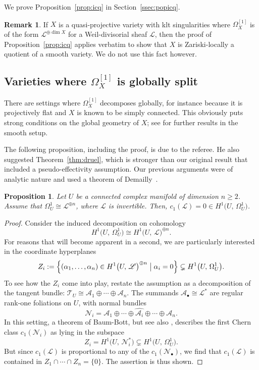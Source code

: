 \documentclass[JEP,XML,SOM,Unicode,published]{cedram}
\let\scr\mathscr
\let\vref\ref
\newcommand{\sbullet}{{\scriptscriptstyle\bullet}}
\theoremstyle{plain}
\newtheorem{prop}[thm]{Proposition}
\theoremstyle{definition}
\newtheorem{rem}[thm]{Remark}
\numberwithin{equation}{thm}
\numberwithin{enumi}{thm}
\newcommand{\sA}{\scr{A}}
\newcommand{\sL}{\scr{L}}
\newcommand{\sN}{\scr{N}}
\newcommand{\sT}{\scr{T}}
\let\what\widehat
\begin{document}
We prove Proposition~\ref{prop:icq} in Section~\vref{ssec:popicq}.

\begin{rem}
If $X$ is a quasi-projective variety with klt singularities where $\Omega^{[1]}_X$
is of the form $\sL^{\oplus \dim X}$ for a Weil-divisorial sheaf $\sL$, then the proof
of Proposition~\ref{prop:icq} applies verbatim to show that $X$ is
Zariski-locally a quotient of a smooth variety. We do not use this fact
however.
\end{rem}

\subsection{Varieties where $\Omega^{[1]}_X$ is globally split}
\label{sec:4-2}

There are settings where $\Omega^{[1]}_X$ decomposes globally, for instance because
it is projectively flat and $X$ is known to be simply connected. This obviously
puts strong conditions on the global geometry of $X$; see \cite{MR1758581} for
further results in the smooth setup.

The following proposition, including the proof, is due to the referee. He also
suggested Theorem~\ref{thm:druel}, which is stronger than our original result
that included a pseudo-effectivity assumption. Our previous arguments were of
analytic nature and used a theorem of Demailly~\cite{Dem02}.

\begin{prop}\label{prop:druel}
Let $U$ be a connected complex manifold of dimension $n \geq 2$. Assume that
$\Omega^1_U \cong \sL^{\oplus n}$, where $\sL$ is invertible. Then,
$c_1(\sL) = 0 \in H^1 \bigl(U,\, \Omega^1_U \bigr)$.
\end{prop}
\begin{proof}
Consider the induced decomposition on cohomology
\[
H^1 \bigl(U,\, \Omega^1_U\bigr) \cong H^1\bigl(U,\, \sL \bigr)^{\oplus n}.
\]
For reasons that
will become apparent in a second, we are particularly interested in the
coordinate hyperplanes
\[
Z_i := \left\{ (\alpha_1, \dots, \alpha_n) \in H^1\bigl(U,\, \sL \bigr)^{\oplus n} \bigm| \alpha_i = 0
\right\} \subsetneq H^1 \bigl(U,\, \Omega^1_U \bigr).
\]
To see how the $Z_i$ come into play, restate the assumption as a decomposition
of the tangent bundle: $\sT_U \cong \sA_1 \oplus \cdots \oplus \sA_n$. The summands $\sA_\sbullet \cong \sL^*$ are
regular rank-one foliations on $U$, with normal bundles
\[
\sN_i = \sA_1 \oplus \cdots \oplus \what{\sA_i} \oplus \cdots \oplus \sA_n.
\]
In this setting, a theorem of Baum-Bott, \cite[Prop.\,3.3 \&
Cor.~3.4]{MR0261635} but see also \cite[Lem.\,3.1]{MR1760872}, describes the
first Chern class $c_1(\sN_i)$ as lying in the subspace
\[
Z_i = H^1 \bigl(U,\, \sN_i^* \bigr) \subsetneq H^1 \bigl(U,\, \Omega^1_U \bigr).
\]
But since $c_1(\sL)$ is proportional to any of the $c_1(\sN_\sbullet)$, we find that
$c_1(\sL)$ is contained in $Z_1 \cap\cdots\cap Z_n = \{0\}$. The assertion is thus shown.
\end{proof}
\end{document}
